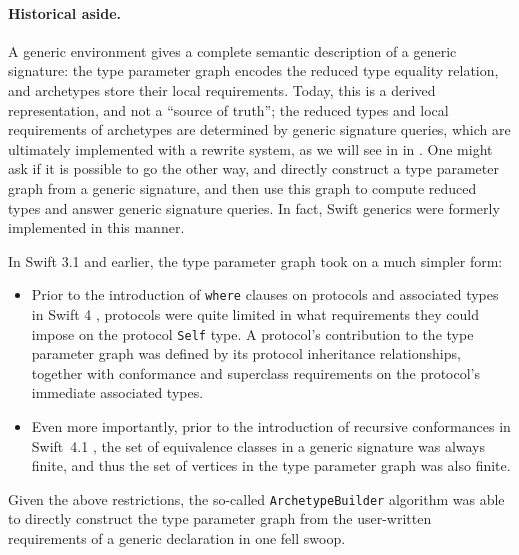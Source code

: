 \documentclass[../generics]{subfiles}
\begin{document}
\paragraph{Historical aside.} A generic environment gives a complete semantic description of a generic signature: the type parameter graph encodes the reduced type equality relation, and archetypes store their local requirements. Today, this is a derived representation, and not a ``source of truth''; the reduced types and local requirements of archetypes are determined by generic signature queries, which are ultimately implemented with a rewrite system, as we will see in in . One might ask if it is possible to go the other way, and directly construct a type parameter graph from a generic signature, and then use this graph to compute reduced types and answer generic signature queries. In fact, Swift generics were formerly implemented in this manner.


In Swift 3.1 and earlier, the type parameter graph took on a much simpler form:
\begin{itemize}
\item Prior to the introduction of \texttt{where} clauses on protocols and associated types in Swift 4 \cite{se0142}, protocols were quite limited in what requirements they could impose on the protocol \texttt{Self} type. A protocol's contribution to the type parameter graph was defined by its protocol inheritance relationships, together with conformance and superclass requirements on the protocol's immediate associated types.
\item Even more importantly, prior to the introduction of recursive conformances in Swift~4.1 \cite{se0157}, the set of equivalence classes in a generic signature was always finite, and thus the set of vertices in the type parameter graph was also finite.
\end{itemize}
Given the above restrictions, the so-called \texttt{ArchetypeBuilder} algorithm was able to directly construct the type parameter graph from the user-written requirements of a generic declaration in one fell swoop.
\end{document}
